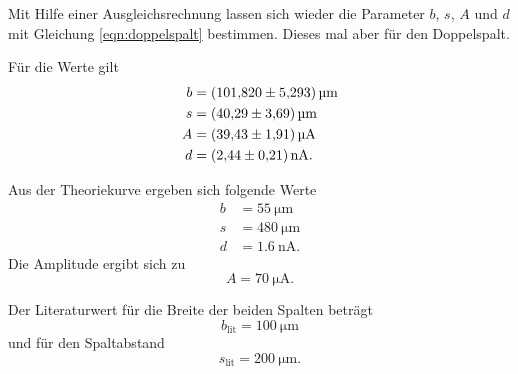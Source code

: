\noindent Mit Hilfe einer Ausgleichsrechnung lassen sich wieder die Parameter $b$, $s$, $A$ und $d$ mit Gleichung \eqref{eqn:doppelspalt} bestimmen. Dieses mal aber für den Doppelspalt. 

\noindent Für die Werte gilt
\begin{align*}
    b &= \SI{101.820 \pm 5.293}{\micro\meter} \\
    s &= \SI{40.29 \pm 3.69}{\micro\meter} \\
    A &= \SI{39.43 \pm 1.91}{\micro\ampere} \\
    d &= \SI{2.44(21)}{\nano\ampere}. 
\end{align*}

\noindent Aus der Theoriekurve ergeben sich folgende Werte
\begin{align*}
    b &= \SI{55}{\micro\meter} \\
    s &= \SI{480}{\micro\meter} \\
    d &= \SI{1.6}{\nano\ampere}.
\end{align*}
Die Amplitude ergibt sich zu 
\begin{equation*}
    A = \SI{70}{\micro\ampere}. %
\end{equation*}

\noindent Der Literaturwert für die Breite der beiden Spalten beträgt
\begin{equation*}
    b_{\text{lit}} = \SI{100}{\micro\meter}
\end{equation*}
und für den Spaltabstand 
\begin{equation*}
    s_{\text{lit}} = \SI{200}{\micro\meter}.
\end{equation*}

